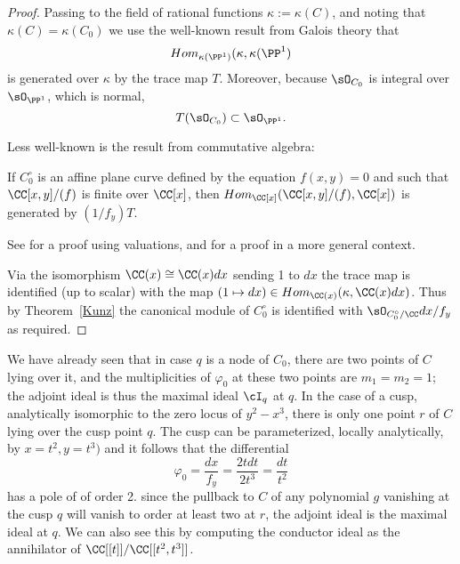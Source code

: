 \begin{proof}
Passing to the field of rational functions $\kappa := \kappa(C)$, and noting that
$\kappa(C) = \kappa(C_{0}) $ we use the well-known result from Galois theory that 
$$
Hom_{\kappa(\PP^{1})}(\kappa, \kappa(\PP^{1})
$$
is generated over $\kappa$ by the trace map $T$. Moreover, 
because $\sO_{C_{0}}$ is integral over $\sO_{\PP^{1}}$, which is normal,
$$
T(\sO_{C_{0}})\subset \sO_{\PP^{1}}.
$$

Less well-known is the result from commutative
algebra:
\begin{fact}
\begin{theorem}\label{Kunz}
If $C_{0}^{\circ}$ is an affine plane curve defined by the
equation $f(x,y)=0$ and such that $\CC[x,y]/(f)$ is finite over $\CC[x]$,
then $Hom_{\CC[x]}(\CC[x,y]/(f), \CC[x])$ is generated by $(1/f_{y})T$.
\end{theorem}
See \cite[Theorem 15.1]{Kunz} for a proof using valuations, and \cite[Theorem A.1]{MR4026452} for a proof in
a more general context.
\end{fact}

Via the isomorphism $\CC(x) \cong \CC(x)dx$ sending 1 to $dx$ the trace map is identified (up to scalar)
with the map $(1\mapsto dx) \in Hom_{\CC(x)}(\kappa, \CC(x)dx)$. Thus by Theorem~\ref{Kunz}
the canonical module of $C_{0}^{\circ}$ is identified with $\sO_{C_{0}^{\circ}/\CC} dx/f_{y}$ as
required.
\end{proof}




\begin{example}
We have already seen that in case $q$ is a node of $C_0$, there are two points of $C$ lying over it, and the multiplicities of $\varphi_0$ at these two points are $m_1=m_2=1$; the adjoint ideal is thus 
 the maximal ideal $\cI_q$ at $q$. In the case of a cusp, analytically isomorphic to the zero locus of $y^2-x^3$, there is only one point $r$ of $C$ lying over the cusp point $q$. The cusp can be parameterized, locally analytically,
 by $x = t^{2}, y = t^{3})$ and it follows that the differential 
 $$
 \varphi_0 = \frac{dx}{f_{y}} =  \frac{2tdt}{2t^{3}} =  \frac{dt}{t^{2}}
 $$ 
 has a pole of of order 2. since the pullback to $C$ of any polynomial $g$ vanishing at the cusp $q$ will vanish to order at least two at $r$, the adjoint ideal is the maximal ideal at $q$. We can also see this by computing the
 conductor ideal as the annihilator of $\CC[[t]]/\CC[[t^{2}, t^{3}]]$.
\end{example}

